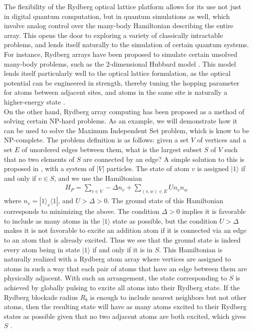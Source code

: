 \documentclass[aps,twocolumn,preprintnumbers]{revtex4}
\newcommand{\eq}{\begin{equation}\begin{aligned}}
\newcommand{\qe}{\end{aligned}\end{equation}}
\newcommand{\bra}[1]{\langle #1|}
\newcommand{\ket}[1]{|#1\rangle}
\begin{document}
The flexibility of the Rydberg optical lattice platform allows for its use not just in digital quantum computation, but in quantum simulations as well, which involve analog control over the many-body Hamiltonian describing the entire array. This opens the door to exploring a variety of classically intractable problems, and lends itself naturally to the simulation of certain quantum systems. \\
For instance, Rydberg arrays have been proposed to simulate certain unsolved many-body problems, such as the 2-dimensional Hubbard model \cite{hubbard}. This model lends itself particularly well to the optical lattice formulation, as the optical potential can be engineered in strength, thereby tuning the hopping parameter for atoms between adjacent sites, and atoms in the same site is naturally a higher-energy state \cite{3d}.\\
On the other hand, Rydberg array computing has been proposed as a method of solving certain NP-hard problems. As an example, we will demonstrate how it can be used to solve the Maximum Independent Set problem, which is know to be NP-complete. The problem definition is as follows: given a set $V$ of vertices and a set $E$ of unordered edges between them, what is the largest subset $S$ of $V$ such that no two elements of $S$ are connected by an edge? A simple solution to this is proposed in \cite{maxset}, with a system of $|V|$ particles. The state of atom $v$ is assigned $\ket{1}$ if and only if $v\in S$, and we use the Hamiltonian
\eq
  H_P=\sum_{v\in V}-\Delta n_v+\sum_{(v,w)\in E}Un_vn_w
\qe
where $n_v=\ket{1}_v\bra{1}$, and $U>\Delta>0$. The ground state of this Hamiltonian corresponds to minimizing the above. The condition $\Delta>0$ implies it is favorable to include as many atoms in the $\ket{1}$ state as possible, but the condition $U>\Delta$ makes it is not favorable to excite an addition atom if it is connected via an edge to an atom that is already excited. Thus we see that the ground state is indeed every atom being in state $\ket{1}$ if and only if it is in $S$. This Hamiltonian is naturally realized with a Rydberg atom array where vertices are assigned to atoms in such a way that each pair of atoms that have an edge between them are physically adjacent. With such an arrangement, the state corresponding to $S$ is achieved by globally pulsing to excite all atoms into their Rydberg state. If the Rydberg blockade radius $R_b$ is enough to include nearest neighbors but not other atoms, then the resulting state will have as many atoms excited to their Rydberg states as possible given that no two adjacent atoms are both excited, which gives $S$ \cite{maxset}.
\end{document}
